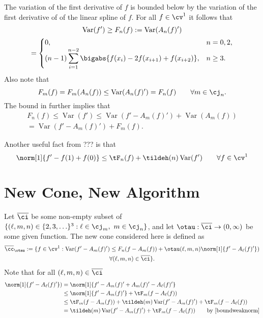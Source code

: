 \documentclass[]{elsarticle}
\DeclareMathOperator{\Var}{Var}
\newcommand{\occ}{\overline{\cc}}
\newcommand{\oci}{\overline{\ci}}
\theoremstyle{definition}
\theoremstyle{remark}
\begin{document}
The variation of the first derivative of $f$ is bounded below by the variation of the first derivative of of the linear spline of $f$.  For all $f \in \cv^1$ it follows that
\begin{multline} 
\Var(f') \ge F_n(f) :=\Var(A_n(f)') \\
 = \begin{cases} 0, & n=0,2, \\
\displaystyle (n-1)\sum_{i=1}^{n-2} \bigabs{f(x_{i}) - 2 f(x_{i+1})+f(x_{i+2})}, 
& n\ge 3. 
\end{cases}
\label{Fnormalg}
\end{multline}
Also note that
\begin{equation} \label{Fnbounda}
F_m(f) = F_m(A_n(f)) \le \Var(A_n(f)') = F_n(f) \qquad \forall m \in \cj_n.
\end{equation}
The bound in  further implies that 
\begin{multline} \label{Fnboundb}
F_n(f) \le \Var(f')  \le \Var(f'-A_m(f)') + \Var(A_m(f)) \\
= \Var(f'-A_m(f)') + F_m(f).
\end{multline}

Another useful fact from ??? is that 
\begin{equation} \label{boundweaknorm}
\norm[1]{f'-f(1)+f(0)} \le \tF_n(f) + \tildeh(n) \Var(f') \qquad \forall f \in \cv^1 
\end{equation}


\section{New Cone, New Algorithm}
Let $\oci$ be some non-empty subset of $\{(\ell,m,n) \in \{2,3,\ldots\}^3 : \ell \in \cj_m, \ m \in \cj_n\}$, and let $\otau:\oci \to (0,\infty)$ be some given function.   The new cone considered here is defined as
\begin{multline} \label{Fcone}
\occ_{\otau}:= \{ f \in \cv^1 :  \Var(f'-A_m(f)') \le F_n(f-A_m(f)) + \otau(\ell,m,n) \norm[1]{f' - A_{\ell}(f)'}) \\ \forall (\ell,m,n) \in \oci \}.
\end{multline}
Note that for all $(\ell,m,n) \in \oci$
\begin{align*}
\norm[1]{f' - A_{\ell}(f)'}) & = \norm[1]{f'-A_m(f)'+A_m(f)' - A_\ell(f)'} \\
& \le  \norm[1]{f'-A_m(f)'} + \tF_m(f-A_\ell(f)) \\
& \le  \tF_m(f-A_m(f)) + \tildeh(m)\Var(f'-A_m(f)') + \tF_m(f-A_\ell(f)) \\
& = \tildeh(m)\Var(f'-A_m(f)') + \tF_m(f-A_\ell(f)) \qquad \text{by \eqref{boundweaknorm}}
\end{align*}
\end{document}
